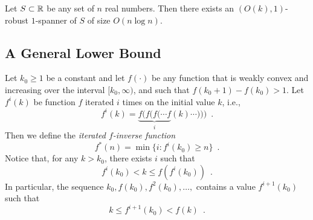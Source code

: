 \documentclass{patmorin}
\begin{document}
\begin{conj}
Let $S\subset \mathbb{R}$ be any set of $n$ real numbers.  Then there exists an
$(O(k),1)$-robust $1$-spanner of $S$ of size $O(n\log n)$.
\end{conj}

\subsection{A General Lower Bound}

Let $k_0\ge 1$ be a constant and let $f(\cdot)$ be any function that is
weakly convex and increasing over the interval $[k_0,\infty)$, and such
that $f(k_0+1)-f(k_0) > 1$.  Let $f^{i}(k)$ be function $f$ iterated
$i$ times on the initial value $k$, i.e.,
\[
   f^{i}(k) = \underbrace{f(f(f(\cdots f}_{i}(k)\cdots))) \enspace .
\]
Then we define the \emph{iterated
$f$-inverse function}
\[
   f^*(n) = \min\{i : f^{i}(k_0) \ge n\} \enspace .
\] 
Notice that, for any $k> k_0$, there exists $i$ such that
\[
   f^i(k_0) < k \le f(f^i(k_0)) \enspace .
\]
In particular, the sequence $k_0,f(k_0),f^2(k_0),\ldots,$ contains
a value $f^{i+1}(k_0)$ such that
\[
      k  \le  f^{i+1}(k_0) < f(k) \enspace .
\]
%
\end{document}
